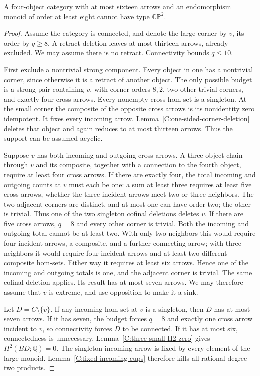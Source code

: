 \begin{proposition}\label{C:sixteen-four-large-corner}
A four-object category with at most sixteen arrows and an
endomorphism monoid of order at least eight cannot have type
$\mathbb{CP}^2$.
\end{proposition}
\begin{proof}
Assume the category is connected, and denote the large corner
by $v$, its order by $q\geq8$. A retract deletion leaves at
most thirteen arrows, already excluded. We may assume there
is no retract. Connectivity bounds $q\leq10$.

First exclude a nontrivial strong component. Every object in
one has a nontrivial corner, since otherwise it is a retract
of another object. The only possible budget is a strong pair
containing $v$, with corner orders $8,2$, two other trivial
corners, and exactly four cross arrows. Every nonempty cross
hom-set is a singleton. At the small corner the composite of
the opposite cross arrows is its nonidentity zero idempotent.
It fixes every incoming arrow. Lemma~\ref{C:one-sided-corner-deletion}
deletes that object and again reduces to at most thirteen arrows.
Thus the support can be assumed acyclic.

Suppose $v$ has both incoming and outgoing cross arrows. A
three-object chain through $v$ and its composite, together
with a connection to the fourth object, require at least
four cross arrows. If there are exactly four, the total
incoming and outgoing counts at $v$ must each be one:
a sum at least three requires at least five cross arrows,
whether the three incident arrows meet two or three neighbors.
The two adjacent corners are distinct, and at most one can
have order two; the other is trivial. Thus one of the two
singleton cofinal deletions deletes $v$.
If there are five cross arrows, $q=8$ and every other corner
is trivial. Both the incoming and outgoing total cannot be
at least two. With only two neighbors this would require
four incident arrows, a composite, and a further connecting
arrow; with three neighbors it would require four incident
arrows and at least two different composite hom-sets.
Either way it requires at least six arrows. Hence one of the
incoming and outgoing totals is one, and the adjacent corner
is trivial. The same cofinal deletion applies. Its result
has at most seven arrows. We may therefore assume that $v$
is extreme, and use opposition to make it a sink.

Let $D=C\setminus\{v\}$. If any incoming hom-set at $v$ is a
singleton, then $D$ has at most seven arrows. If it has seven,
the budget forces $q=8$ and exactly one cross arrow incident
to $v$, so connectivity forces $D$ to be connected. If it has
at most six, connectedness is unnecessary.
Lemma~\ref{C:three-small-H2-zero} gives $H^2(BD;\mathbb Q)=0$.
The singleton incoming arrow is fixed by every element of the
large monoid. Lemma~\ref{C:fixed-incoming-cups} therefore kills
all rational degree-two products.


\end{proof}

